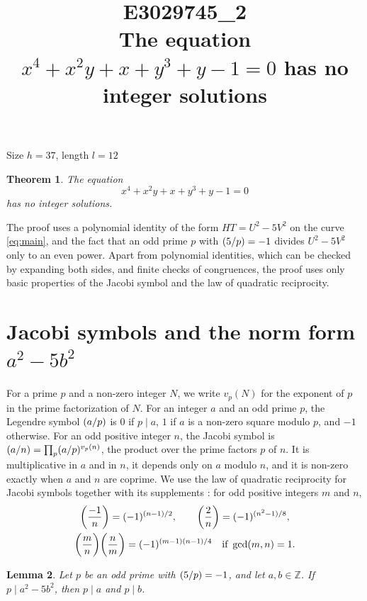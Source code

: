 \documentclass[11pt]{article}
\title{\textbf{E3029745\_2}\\[4pt] {\Large The equation $x^{4}+x^{2}y+x+y^{3}+y-1=0$ has no integer solutions}}
\author{}
\date{}
\newtheorem{theorem}{Theorem}
\newtheorem{lemma}[theorem]{Lemma}
\newcommand{\Z}{\mathbb{Z}}
\newcommand{\leg}[2]{\mathchoice{\biggl(\dfrac{#1}{#2}\biggr)}{(#1/#2)}{(#1/#2)}{(#1/#2)}}
\begin{document}
\maketitle
\vspace{-8ex}
\begin{center}
Size $h=37$, length $l=12$
\end{center}

\begin{theorem}\label{thm:main}
The equation
\begin{equation}\label{eq:main}
x^{4}+x^{2}y+x+y^{3}+y-1=0
\end{equation}
has no integer solutions.
\end{theorem}

The proof uses a polynomial identity of the form $HT=U^2-5V^2$ on the curve \eqref{eq:main}, and the fact that an odd prime $p$ with $\leg{5}{p}=-1$ divides $U^2-5V^2$ only to an even power. Apart from polynomial identities, which can be checked by expanding both sides, and finite checks of congruences, the proof uses only basic properties of the Jacobi symbol and the law of quadratic reciprocity.

\section{\texorpdfstring{Jacobi symbols and the norm form $a^2-5b^2$}{Jacobi symbols and the norm form}}

For a prime $p$ and a non-zero integer $N$, we write $v_p(N)$ for the exponent of $p$ in the prime factorization of $N$. For an integer $a$ and an odd prime $p$, the Legendre symbol $\leg{a}{p}$ is $0$ if $p\mid a$, $1$ if $a$ is a non-zero square modulo $p$, and $-1$ otherwise. For an odd positive integer $n$, the Jacobi symbol is $\leg{a}{n}=\prod_p\leg{a}{p}^{v_p(n)}$, the product over the prime factors $p$ of $n$. It is multiplicative in $a$ and in $n$, it depends only on $a$ modulo $n$, and it is non-zero exactly when $a$ and $n$ are coprime. We use the law of quadratic reciprocity for Jacobi symbols together with its supplements \cite[Chapter~5, \S2]{IR}: for odd positive integers $m$ and $n$,
\begin{gather*}
\leg{-1}{n}=(-1)^{(n-1)/2},\qquad\leg{2}{n}=(-1)^{(n^2-1)/8},\\
\leg{m}{n}\leg{n}{m}=(-1)^{(m-1)(n-1)/4}\quad\text{if }\gcd(m,n)=1.
\end{gather*}

\begin{lemma}\label{lem:divides}
Let $p$ be an odd prime with $\leg{5}{p}=-1$, and let $a,b\in\Z$. If $p\mid a^2-5b^2$, then $p\mid a$ and $p\mid b$.
\end{lemma}
\end{document}

